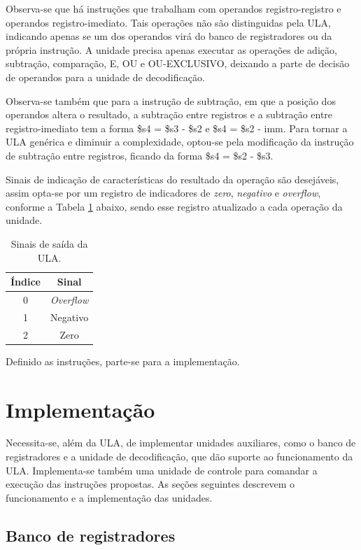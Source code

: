 \documentclass[11pt,a4paper,titlepage]{article}
\begin{document}
Observa-se que há instruções que trabalham com operandos registro-registro e operandos registro-imediato. Tais operações não são distinguidas pela ULA, indicando apenas se um dos operandos virá do banco de registradores ou da própria instrução. A unidade precisa apenas executar as operações de adição, subtração, comparação, E, OU e OU-EXCLUSIVO, deixando a parte de decisão de operandos para a unidade de decodificação.

Observa-se também que para a instrução de subtração, em que a posição dos operandos altera o resultado, a subtração entre registros e a subtração entre registro-imediato tem a forma \$s4 = \$s3 - \$s2 e \$s4 = \$s2 - imm. Para tornar a ULA genérica e diminuir a complexidade, optou-se pela modificação da instrução de subtração entre registros, ficando da forma \$s4 = \$s2 - \$s3.

Sinais de indicação de características do resultado da operação são desejáveis, assim opta-se por um registro de indicadores de \textit{zero}, \textit{negativo} e \textit{overflow}, conforme a Tabela \ref{tab:flags} abaixo, sendo esse registro atualizado a cada operação da unidade.

\begin{table}[h]
\centering
\begin{tabular}{| c | c |}
\hline
Índice & Sinal\\
\hline
0 & \textit{Overflow}\\
\hline
1 & Negativo \\
\hline
2 & Zero\\
\hline
\end{tabular}
\caption{Sinais de saída da ULA.}
\label{tab:flags}
\end{table}
%

Definido as instruções, parte-se para a implementação.

\section{Implementação}

Necessita-se, além da ULA, de implementar unidades auxiliares, como o banco de registradores e a unidade de decodificação, que dão suporte ao funcionamento da ULA. Implementa-se também uma unidade de controle para comandar a execução das instruções propostas. As seções seguintes descrevem o funcionamento e a implementação das unidades.

\subsection{Banco de registradores}\label{subsec:imp-br}
\end{document}
